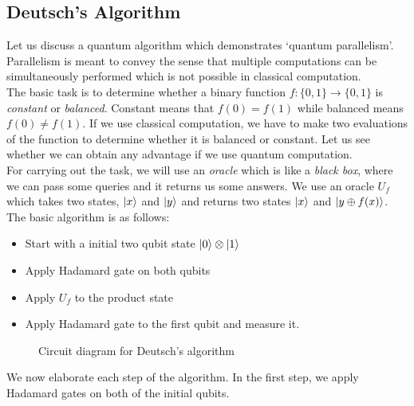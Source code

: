     \subsection{Deutsch's Algorithm}
    Let us discuss a quantum algorithm which demonstrates `quantum parallelism'. Parallelism is meant to convey the sense that multiple computations can be simultaneously performed which is not possible in classical computation.\\[0.2cm]
    The basic task is to determine whether a binary function $f:\{0,1\}\to \{0,1\}$ is \textit{constant} or \textit{balanced}. Constant means that $f(0)=f(1)$ while balanced means $f(0)\neq f(1)$. If we use classical computation, we have to make two evaluations of the function to determine whether it is balanced or constant. Let us see whether we can obtain any advantage if we use quantum computation.\\[0.2cm]
    For carrying out the task, we will use an \textit{oracle} which is like a \textit{black box}, where we can pass some queries and it returns us some answers. We use an oracle $U_f$ which takes two states, $\ket{x}$ and $\ket{y}$ and returns two states $\ket{x}$ and $\ket{y\oplus f(x)}$. The basic algorithm is as follows:
    \begin{itemize}
        \item Start with a initial two qubit state $\ket{0}\otimes \ket{1}$
        \item Apply Hadamard gate on both qubits 
        \item Apply $U_f$ to the product state 
        \item Apply Hadamard gate to the first qubit and measure it.
    \end{itemize}
    \begin{figure}[H]
            \centering
    \caption{Circuit diagram for Deutsch's algorithm}
        \end{figure}
We now elaborate each step of the algorithm. In the first step, we apply Hadamard gates on both of the initial qubits. 
